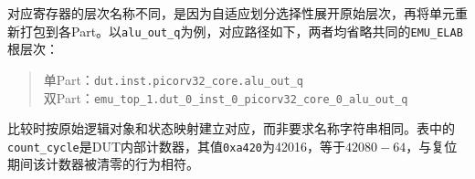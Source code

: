 对应寄存器的层次名称不同，是因为自适应划分选择性展开原始层次，再将单元重新打包到各Part。以\texttt{alu\_out\_q}为例，对应路径如下，两者均省略共同的\texttt{EMU\_ELAB}根层次：
\begin{quote}
    \small
    单Part：\texttt{dut.inst.picorv32\_core.alu\_out\_q}\\
    双Part：\texttt{emu\_top\_1.dut\_0\_inst\_0\_picorv32\_core\_0\_alu\_out\_q}
\end{quote}
比较时按原始逻辑对象和状态映射建立对应，而非要求名称字符串相同。表中的\texttt{count\_cycle}是DUT内部计数器，其值\texttt{0xa420}为42016，等于$42080-64$，与复位期间该计数器被清零的行为相符。

